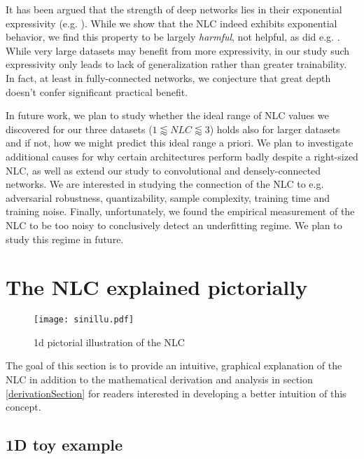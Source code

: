 \documentclass{article} %
\begin{document}
It has been argued that the strength of deep networks lies in their exponential expressivity (e.g. \citet{trajectoryTransitions,depth6}). While we show that the NLC indeed exhibits exponential behavior, we find this property to be largely {\it harmful}, not helpful, as did e.g. \citet{depthScalesMeanField}. While very large datasets may benefit from more expressivity, in our study such expressivity only leads to lack of generalization rather than greater trainability. In fact, at least in fully-connected networks, we conjecture that great depth doesn't confer significant practical benefit.

In future work, we plan to study whether the ideal range of NLC values we discovered for our three datasets ($1 \lessapprox NLC \lessapprox 3$) holds also for larger datasets and if not, how we might predict this ideal range a priori. We plan to investigate additional causes for why certain architectures perform badly despite a right-sized NLC, as well as extend our study to convolutional and densely-connected networks. We are interested in studying the connection of the NLC to e.g. adversarial robustness, quantizability, sample complexity, training time and training noise. Finally, unfortunately, we found the empirical measurement of the NLC to be too noisy to conclusively detect an underfitting regime. We plan to study this regime in future.







\appendix
\newpage

\section{The NLC explained pictorially} \label{pictorialSection}


\begin{wrapfigure}{r}{4.7cm}
\texttt{[image: sinillu.pdf]}
\caption{1d pictorial illustration of the NLC}\label{sinillu}
\end{wrapfigure} 

The goal of this section is to provide an intuitive, graphical explanation of the NLC in addition to the mathematical derivation and analysis in section \ref{derivationSection} for readers interested in developing a better intuition of this concept.



\subsection{1D toy example}
\end{document}

